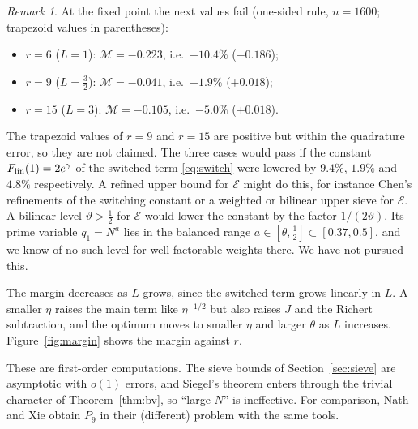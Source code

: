 \documentclass[11pt]{amsart}
\theoremstyle{remark}
\newtheorem{remark}[theorem]{Remark}
\newcommand{\cE}{\mathcal E}
\begin{document}
\begin{remark}\label{rem:18}
At the fixed point the next values fail (one-sided rule, $n=1600$; trapezoid values in parentheses):
\begin{itemize}[leftmargin=1.5em]
\item $r=6$ ($L=1$): $\mathcal M=-0.223$, i.e.\ $-10.4\%$ ($-0.186$);
\item $r=9$ ($L=\frac32$): $\mathcal M=-0.041$, i.e.\ $-1.9\%$ ($+0.018$);
\item $r=15$ ($L=3$): $\mathcal M=-0.105$, i.e.\ $-5.0\%$ ($+0.018$).
\end{itemize}
The trapezoid values of $r=9$ and $r=15$ are positive but within the quadrature error, so they are not claimed. The three cases would pass if the constant $F_{\rm lin}(1)=2e^\gamma$ of the switched term \eqref{eq:switch} were lowered by $9.4\%$, $1.9\%$ and $4.8\%$ respectively. A refined upper bound for $\cE$ might do this, for instance Chen's refinements of the switching constant or a weighted or bilinear upper sieve for $\cE$. A bilinear level $\vartheta>\frac12$ for $\cE$ would lower the constant by the factor $1/(2\vartheta)$. Its prime variable $q_1=N^a$ lies in the balanced range $a\in[\theta,\frac12]\subset[0.37,0.5]$, and we know of no such level for well-factorable weights there. We have not pursued this.
\end{remark}

The margin decreases as $L$ grows, since the switched term grows linearly in $L$. A smaller $\eta$ raises the main term like $\eta^{-1/2}$ but also raises $J$ and the Richert subtraction, and the optimum moves to smaller $\eta$ and larger $\theta$ as $L$ increases. Figure~\ref{fig:margin} shows the margin against $r$.

These are first-order computations. The sieve bounds of Section~\ref{sec:sieve} are asymptotic with $o(1)$ errors, and Siegel's theorem enters through the trivial character of Theorem~\ref{thm:bv}, so ``large $N$'' is ineffective. For comparison, Nath and Xie \cite{NX} obtain $P_9$ in their (different) problem with the same tools.
\end{document}
